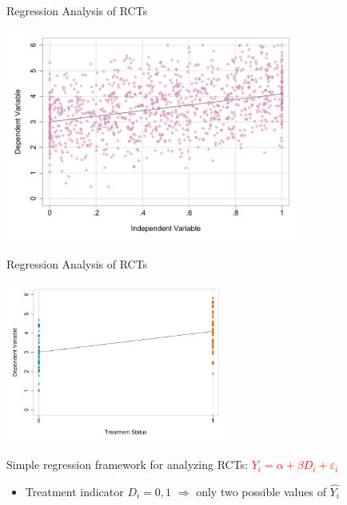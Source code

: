 \documentclass[10pt,xcolor=table,ignorenonframetext,handout,aspectratio=169]{beamer}
\newlength{\wideitemsep}
\let\olditem\item
\renewcommand{\item}{\setlength{\itemsep}{\wideitemsep}\olditem}
\begin{document}

\begin{frame}{Regression Analysis of RCTs}

\medskip
\begin{center}
	\includegraphics[width=0.72\textwidth]{fig/reg-w-continuous-x.pdf}
\end{center}

%
%	
%	

\end{frame}





\begin{frame}{Regression Analysis of RCTs}

\medskip
\begin{center}
	\includegraphics[width=0.54\textwidth]{fig/TvsCreg.pdf}
\end{center}

Simple regression framework for analyzing RCTs: \textcolor{red}{$Y_i = \alpha + \beta D_i + \varepsilon_i$}

\medskip
\begin{itemize}
	
	\item Treatment indicator $D_i = 0,1$ $\Rightarrow$ only two possible values of $\hat{Y_i}$
	
\end{itemize}

\end{frame}
\end{document}
